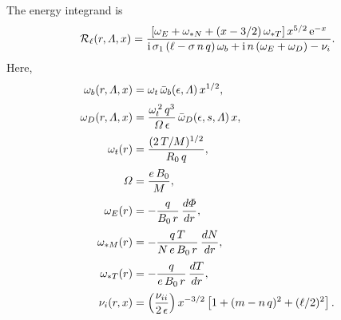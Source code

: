 \documentclass[12pt,prb,aps,notitlepage]{revtex4-1}
\begin{document}
The energy integrand is 
\begin{equation}
{\cal R}_\ell(r,{\mit\Lambda},x) =\frac{[\omega_E + \omega_{\ast N}+(x-3/2)\,\omega_{\ast T}]\,x^{5/2}\,{\rm e}^{-x}}{
{\rm i}\,\sigma_1\,(\ell - \sigma\,n\,q)\,\omega_b +{\rm i}\,n\,(\omega_E+\omega_D)-\nu_i}.
\end{equation}
Here, 
\begin{align}
\omega_b(r,{\mit\Lambda},x) &=\omega_t\,\bar{\omega}_b(\epsilon,{\mit\Lambda})\,x^{1/2},\\[0.5ex]
\omega_D(r,{\mit\Lambda,x}) &= \frac{\omega_t^{\,2}\,q^3}{{\mit\Omega}\,\epsilon}\,\bar{\omega}_D(\epsilon,s,{\mit\Lambda})\,x,\\[0.5ex]
\omega_t(r) &= \frac{(2\,T/M)^{1/2}}{R_0\,q},\\[0.5ex]
{\mit\Omega} &= \frac{e\,B_0}{M},\\[0.5ex]
\omega_E(r) &= - \frac{q}{B_0\,r}\,\frac{d{\mit\Phi}}{dr},\\[0.5ex]
\omega_{\ast M}(r) &= -\frac{q\,T}{N\,e\,B_0\,r}\,\frac{dN}{dr},\\[0.5ex]
\omega_{\ast T}(r) &= - \frac{q}{e\,B_0\,r}\,\frac{dT}{dr},\\[0.5ex]
\nu_i(r,x) &= \left(\frac{\nu_{ii}}{2\,\epsilon}\right) x^{-3/2}\left[1+(m-n\,q)^2 + (\ell/2)^2\right].
\end{align}
\end{document}
